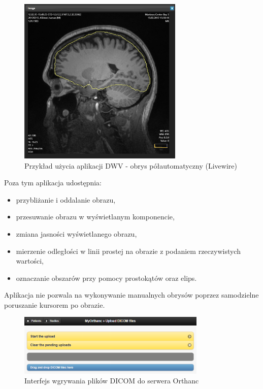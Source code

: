 \documentclass[a4paper,11pt,twoside,openright]{report}
\theoremstyle{definition}
\begin{document}
\begin{figure}[tb!]
	\center
	\includegraphics[width=0.7\textwidth]{DWV-interface}
	\caption{Przykład użycia aplikacji DWV - obrys półautomatyczny (Livewire)}
    	\label{fig:DWV-interface}
\end{figure}

 Poza tym aplikacja udostępnia:
\begin{itemize}[noitemsep]
\item przybliżanie i oddalanie obrazu,
\item przesuwanie obrazu w wyświetlanym komponencie,
\item zmiana jasności wyświetlanego obrazu,
\item mierzenie odległości w linii prostej na obrazie z podaniem rzeczywistych wartości,
\item oznaczanie obszarów przy pomocy prostokątów oraz elips.
\end{itemize}

Aplikacja nie pozwala na wykonywanie manualnych obrysów poprzez samodzielne
poruszanie kursorem po obrazie.


\begin{figure}[tb!]
	\center
	\includegraphics[width=0.8\textwidth]{Orthanc-upload}
	\caption{Interfejs wgrywania plików DICOM do serwera Orthanc}
    	\label{fig:Orthanc-upload}
\end{figure}
\end{document}
